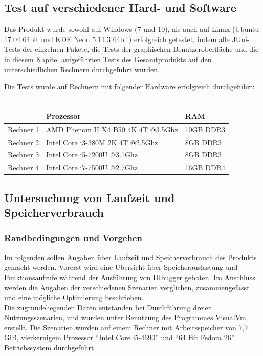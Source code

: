 \documentclass[parskip=full]{scrartcl}
\begin{document}
\subsection{Test auf verschiedener Hard- und Software}

Das Produkt wurde sowohl auf Windows (7 und 10), als auch auf Linux (Ubuntu 17.04 64bit und KDE Neon 5.11.3 64bit) erfolgreich getestet, indem alle JUni-Tests der einzelnen Pakete, die Tests der graphischen Benutzeroberfläche und die in diesem Kapitel aufgeführten Tests des Gesamtprodukts auf den unterschiedlichen Rechnern durchgeführt wurden.

Die Tests wurde auf Rechnern mit folgender Hardware erfolgreich durchgeführt: \\ \\
\begin{tabular}{l||l|l}
   	 & Prozessor & RAM \\
	\hline
	\hline
	Rechner 1 & AMD Phenom II X4 B50 4K 4T @3.5Ghz & 10GB DDR3 \\
	Rechner 2 & Intel Core i3-380M 2K 4T @2.5Ghz & 8GB DDR3 \\
	Rechner 3 & Intel Core i5-7200U @3.1Ghz & 8GB DDR3 \\
	Rechner 4 & Intel Core i7-7500U @2.7Ghz & 16GB DDR4\\
\end{tabular}


\subsection{Untersuchung von Laufzeit und Speicherverbrauch}
    \subsubsection{Randbedingungen und Vorgehen}
        Im folgenden sollen Angaben über Laufzeit und Speicherverbrauch des Produkts gemacht werden.
        Vorerst wird eine Übersicht über Speicherauslastung und Funktionsaufrufe während der Ausführung von DIbugger geboten.
        Im Anschluss werden die Angaben der verschiedenen Szenarien verglichen, zusammengefasst und eine mögliche Optimierung beschrieben.\\
        Die zugrundeliegenden Daten entstanden bei Durchführung dreier Nutzungsszenarien, und wurden unter Benutzung des Programmes VisualVm erstellt.
        Die Szenarien wurden auf einem Rechner mit Arbeitsspeicher von 7,7 GiB, vierkernigem Prozessor \enquote{Intel Core i5-4690} und \enquote{64 Bit Fedora 26} Betriebssystem durchgeführt.
\end{document}
